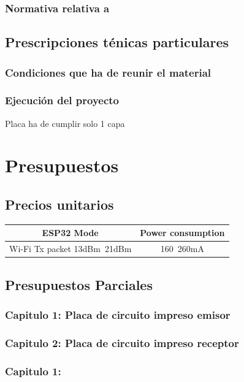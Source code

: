 \documentclass[a4paper ,12pt, onecolumn]{article}
\begin{document}
        \subsubsection{Normativa relativa a }
    \subsection{Prescripciones ténicas particulares}
        \subsubsection{Condiciones que ha de reunir el material}
        \subsubsection{Ejecución del proyecto}
        Placa ha de cumplir solo 1 capa
\section{Presupuestos}
    \subsection{Precios unitarios}
        \begin{center}
            \begin{tabular}{||c | c ||} 
            \hline
            ESP32 Mode & Power consumption  \\ [0.5ex] 
            \hline\hline
            Wi-Fi Tx packet 13dBm~21dBm & 160~260mA  \\ 
            \hline
            \end{tabular}
        \end{center}
    \subsection{Presupuestos Parciales}
        \subsubsection{Capitulo 1: Placa de circuito impreso emisor}
        \subsubsection{Capitulo 2: Placa de circuito impreso receptor}
        \subsubsection{Capitulo 1: }
\end{document}
